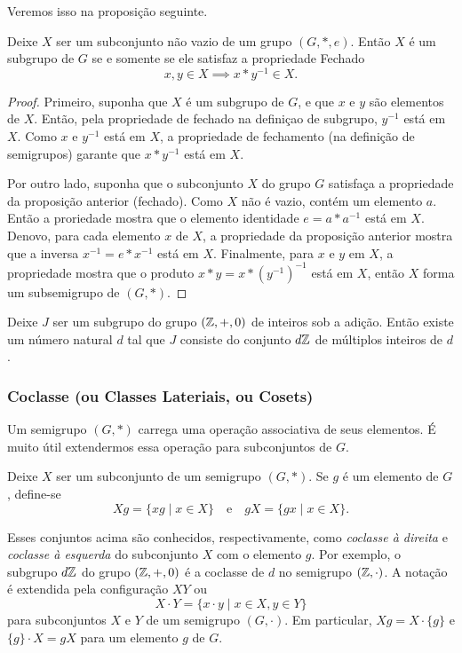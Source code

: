 Veremos isso na proposição seguinte.
\begin{stat}
  Deixe $X$ ser um subconjunto não vazio de um grupo $(G,*,e)$. Então $X$ é um subgrupo de $G$ se e somente se ele satisfaz a propriedade Fechado
  $$x,y \in X \implies x*y^{-1} \in X.$$
  \begin{proof}
    Primeiro, suponha que $X$ é um subgrupo de $G$, e que $x$ e $y$ são elementos de $X$. Então, pela propriedade de fechado na definiçao de subgrupo, $y^{-1}$ está em $X$. Como $x$ e $y^{-1}$ está em $X$, a propriedade de fechamento (na definição de semigrupos) garante que $x*y^{-1}$ está em $X$.

    Por outro lado, suponha que o subconjunto $X$ do grupo $G$ satisfaça a propriedade da proposição anterior (fechado). Como $X$ não é vazio, contém um elemento $a$. Então a proriedade mostra que o elemento identidade $e = a * a^{-1}$ está em $X$. Denovo, para cada elemento $x$ de $X$, a propriedade da proposição anterior mostra que a inversa $x^{-1} = e * x^{-1}$ está em $X$. Finalmente, para $x$ e $y$ em $X$, a propriedade mostra que o produto $x*y=x*(y^{-1})^{-1}$ está em $X$, então $X$ forma um subsemigrupo de $(G,*)$.
  \end{proof}
\end{stat}

\begin{theorem}
  Deixe $J$ ser um subgrupo do grupo $(\mathbb{Z},+,0)$ de inteiros sob a adição. Então existe um número natural $d$ tal que $J$ consiste do conjunto $d\mathbb{Z}$ de múltiplos inteiros de $d$.
\end{theorem}

\subsubsection{Coclasse (ou Classes Lateriais, ou Cosets)}
Um semigrupo $(G,*)$ carrega uma operação associativa de seus elementos. É muito útil extendermos essa operação para subconjuntos de $G$.

Deixe $X$ ser um subconjunto de um semigrupo $(G,*)$. Se $g$ é um elemento de $G$, define-se $$ Xg = \{xg \mid x \in X\}\quad \textrm{e}\quad gX = \{gx \mid x \in X\}.$$

Esses conjuntos acima são conhecidos, respectivamente, como \emph{coclasse à direita} e \emph{coclasse à esquerda} do subconjunto $X$ com o elemento $g$. Por exemplo, o subgrupo $d\mathbb{Z}$ do grupo $(\mathbb{Z},+,0)$ é a coclasse de $d$ no semigrupo $(\mathbb{Z},\cdot)$.\newline
A notação é extendida pela configuração $XY$ ou
$$ X\cdot Y = \{x\cdot y \mid x \in X, y\in Y\}$$
para subconjuntos $X$ e $Y$ de um semigrupo $(G,\cdot)$. Em particular, $Xg = X\cdot \{g\}$ e $\{g\} \cdot X = gX$ para um elemento $g$ de $G$.

